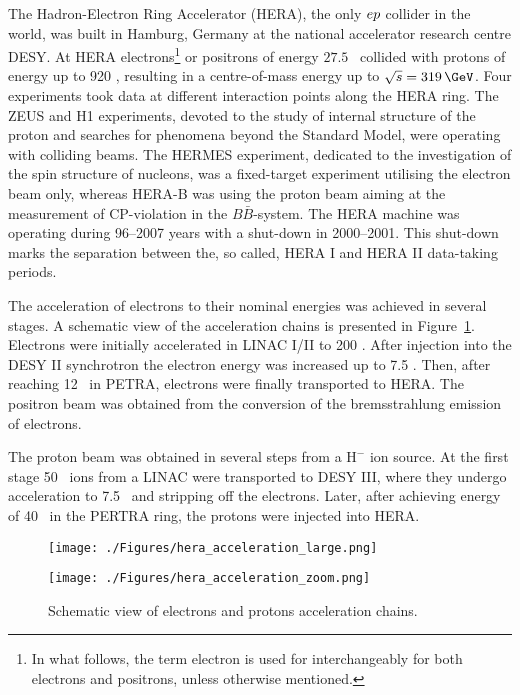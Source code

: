 The Hadron-Electron Ring Accelerator (HERA), the only $\mbox{$e p$}$ collider in the world, was built in Hamburg, Germany at the national accelerator research centre DESY. At HERA electrons\footnote{In what follows, the term electron is used for interchangeably for both electrons and positrons, unless otherwise mentioned.} or positrons of energy $27.5$ \GeV\, collided with protons of energy up to 920 \GeV, resulting in a centre-of-mass energy up to $\sqs = 319\, \GeV$. Four experiments took data at different interaction points along the HERA ring. The ZEUS and H1 experiments, devoted to the study of internal structure of the proton and searches for phenomena beyond the Standard Model, were operating with colliding beams. The HERMES experiment, dedicated to the investigation of the spin structure of nucleons, was a fixed-target experiment utilising the electron beam only, whereas HERA-B was using the proton beam aiming at the measurement of CP-violation in the $B\bar{B}$-system. The HERA machine was operating during 96--2007 years with a shut-down in 2000--2001. This shut-down marks the separation between the, so called, HERA I and HERA II data-taking periods.

The acceleration of electrons to their nominal energies was achieved in several stages. A schematic view of the acceleration chains is presented in Figure~\ref{fig:hera_acceleration}. Electrons were initially accelerated in LINAC I/II to 200 \MeV. After injection into the DESY II synchrotron the electron energy was increased up to 7.5 \GeV. Then, after reaching 12 \GeV\, in PETRA, electrons were finally transported to HERA. The positron beam was obtained from the conversion of the bremsstrahlung emission of electrons. 

The proton beam was obtained in several steps from a $\text{H}^-$ ion source. At the first stage 50 \MeV\, ions from a LINAC were transported to DESY III, where they undergo acceleration to 7.5 \GeV\, and stripping off the electrons. Later, after achieving energy of 40 \GeV\, in the PERTRA ring, the protons were injected into HERA.

\begin{figure}[htpb]
	\centering
	\begin{subfloat}[]{\texttt{[image: ./Figures/hera\_acceleration\_large.png]}
			\label{fig:hera_acceleration_large}
	 }%
	\end{subfloat}
	\begin{subfloat}[]{\texttt{[image: ./Figures/hera\_acceleration\_zoom.png]}
			\label{fig:hera_acceleration_zoom}
	 }%
	\end{subfloat}
	\caption{Schematic view of electrons and protons acceleration chains.}
\label{fig:hera_acceleration}
\end{figure}

